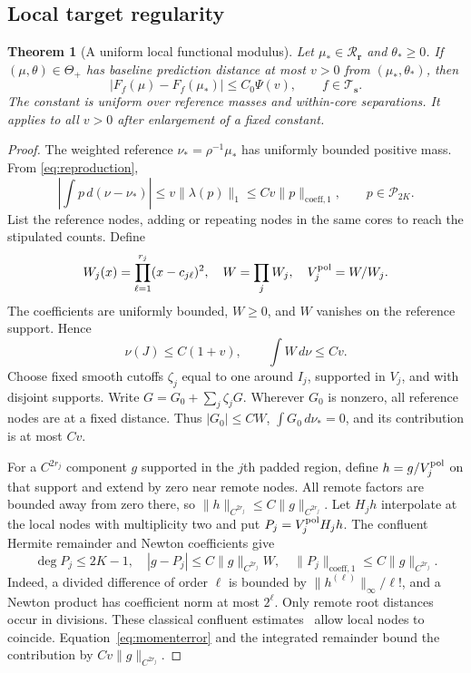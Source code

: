 \documentclass[10pt]{amsart}
\newtheorem{theorem}{Theorem}[section]
\theoremstyle{definition}
\theoremstyle{remark}
\newcommand{\dd}{\,d}
\newcommand{\ThetaAll}{\Theta_+}
\newcommand{\Pp}{\mathcal P}
\newcommand{\Tclass}{\mathcal T_{\boldsymbol s}}
\newcommand{\Rclass}{\mathcal R_{\boldsymbol r}}
\begin{document}
\subsection{Local target regularity}
\begin{theorem}[A uniform local functional modulus]\label{thm:modulus}
Let $\mu_*\in\Rclass$ and $\theta_*\ge0$. If $(\mu,\theta)\in\ThetaAll$ has baseline prediction distance at most $v>0$ from $(\mu_*,\theta_*)$, then
\begin{equation}\label{eq:modulus}
 |F_f(\mu)-F_f(\mu_*)|\le C_0\Psi(v),\qquad f\in\Tclass.
\end{equation}
The constant is uniform over reference masses and within-core separations. It applies to all $v>0$ after enlargement of a fixed constant.
\end{theorem}
\begin{proof}
The weighted reference $\nu_*=\rho^{-1}\mu_*$ has uniformly bounded positive mass. From \eqref{eq:reproduction},
\begin{equation}\label{eq:momenterror}
 \left|\int p\dd(\nu-\nu_*)\right|\le
 v\|\lambda(p)\|_1\le Cv\|p\|_{\mathrm{coeff},1},\qquad p\in\Pp_{2K}.
\end{equation}
List the reference nodes, adding or repeating nodes in the same cores to reach the stipulated counts. Define
\[
 W_j(x)=\prod_{\ell=1}^{r_j}(x-c_{j\ell})^2,\quad
 W=\prod_jW_j,\quad V_j^{\rm pol}=W/W_j.
\]
The coefficients are uniformly bounded, $W\ge0$, and $W$ vanishes on the reference support. Hence
\begin{equation}\label{eq:massleak}
 \nu(J)\le C(1+v),\qquad \int W\dd\nu\le Cv.
\end{equation}
Choose fixed smooth cutoffs $\zeta_j$ equal to one around $I_j$, supported in $V_j$, and with disjoint supports. Write $G=G_0+\sum_j\zeta_jG$. Wherever $G_0$ is nonzero, all reference nodes are at a fixed distance. Thus $|G_0|\le CW$, $\int G_0\dd\nu_*=0$, and its contribution is at most $Cv$.

For a $C^{2r_j}$ component $g$ supported in the $j$th padded region, define $h=g/V_j^{\rm pol}$ on that support and extend by zero near remote nodes. All remote factors are bounded away from zero there, so $\|h\|_{C^{2r_j}}\le C\|g\|_{C^{2r_j}}$. Let $H_jh$ interpolate at the local nodes with multiplicity two and put $P_j=V_j^{\rm pol}H_jh$. The confluent Hermite remainder and Newton coefficients give
\begin{equation}\label{eq:localfactor}
 \deg P_j\le2K-1,\quad
 |g-P_j|\le C\|g\|_{C^{2r_j}}W,\quad
 \|P_j\|_{\mathrm{coeff},1}\le C\|g\|_{C^{2r_j}}.
\end{equation}
Indeed, a divided difference of order $\ell$ is bounded by $\|h^{(\ell)}\|_\infty/\ell!$, and a Newton product has coefficient norm at most $2^\ell$. Only remote root distances occur in divisions. These classical confluent estimates~\cite{deboor} allow local nodes to coincide. Equation~\eqref{eq:momenterror} and the integrated remainder bound the contribution by $Cv\|g\|_{C^{2r_j}}$.


\end{proof}
\end{document}
